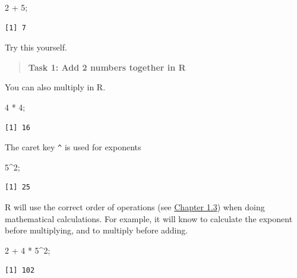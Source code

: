 \documentclass[
]{scrbook}
\newenvironment{Shaded}{\begin{snugshade}}{\end{snugshade}}
\newcommand{\DecValTok}[1]{\textcolor[rgb]{0.00,0.00,0.81}{#1}}
\newcommand{\NormalTok}[1]{#1}
\newcommand{\SpecialCharTok}[1]{\textcolor[rgb]{0.00,0.00,0.00}{#1}}
\begin{document}
\begin{Shaded}
\begin{Highlighting}[]
\DecValTok{2} \SpecialCharTok{+} \DecValTok{5}\NormalTok{;  }
\end{Highlighting}
\end{Shaded}

\begin{verbatim}
[1] 7
\end{verbatim}

Try this yourself.

\begin{quote}
\textbf{Task 1: Add 2 numbers together in R}
\end{quote}

You can also multiply in R.

\begin{Shaded}
\begin{Highlighting}[]
\DecValTok{4} \SpecialCharTok{*} \DecValTok{4}\NormalTok{;  }
\end{Highlighting}
\end{Shaded}

\begin{verbatim}
[1] 16
\end{verbatim}

The caret key \texttt{\^{}} is used for exponents

\begin{Shaded}
\begin{Highlighting}[]
\DecValTok{5}\SpecialCharTok{\^{}}\DecValTok{2}\NormalTok{;  }
\end{Highlighting}
\end{Shaded}

\begin{verbatim}
[1] 25
\end{verbatim}

R will use the correct order of operations (see \protect\hyperlink{order-of-operations}{Chapter 1.3}) when doing mathematical calculations.
For example, it will know to calculate the exponent before multiplying, and to multiply before adding.

\begin{Shaded}
\begin{Highlighting}[]
\DecValTok{2} \SpecialCharTok{+} \DecValTok{4} \SpecialCharTok{*} \DecValTok{5}\SpecialCharTok{\^{}}\DecValTok{2}\NormalTok{;  }
\end{Highlighting}
\end{Shaded}

\begin{verbatim}
[1] 102
\end{verbatim}
\end{document}
